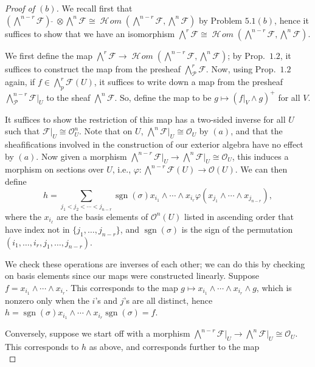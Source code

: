 \documentclass[12pt,letterpaper]{article}
\theoremstyle{definition}
\theoremstyle{remark}
\numberwithin{equation}{section}
\numberwithin{figure}{problem}
\DeclareMathOperator{\sgn}{sgn}
\newcommand{\FF}{\mathscr{F}}
\newcommand{\OO}{\mathcal{O}}
\newcommand{\PP}{\mathcal{P}}
\DeclareMathOperator{\HHom}{\mathscr{H}\!\mathit{om}}
\begin{document}
\begin{proof}[Proof of $(b)$]
  We recall first that $(\bigwedge^{n-r}\FF)\:\check{}\: \otimes \bigwedge^n\FF \cong \HHom(\bigwedge^{n-r}\FF,\bigwedge^n\FF)$ by Problem $5.1(b)$, hence it suffices to show that we have an isomorphism $\bigwedge^r\FF \cong \HHom(\bigwedge^{n-r}\FF,\bigwedge^n\FF)$.
  \par We first define the map $\bigwedge^r\FF \to \HHom(\bigwedge^{n-r}\FF,\bigwedge^n\FF)$; by Prop.~$1.2$, it suffices to construct the map from the presheaf $\bigwedge^r_\PP\FF$. Now, using Prop.~$1.2$ again, if $f \in \bigwedge^r_p\FF(U)$, it suffices to write down a map from the presheaf $\bigwedge^{n-r}_\PP\FF\vert_U$ to the sheaf $\bigwedge^n\FF$. So, define the map to be $g \mapsto (f\vert_V \wedge g)^+$ for all $V$.
  \par It suffices to show the restriction of this map has a two-sided inverse for all $U$ such that $\FF\vert_U \cong \OO_U^n$. Note that on $U$, $\bigwedge^n\FF\vert_U \cong \OO_U$ by $(a)$, and that the sheafifications involved in the construction of our exterior algebra have no effect by $(a)$. Now given a morphism $\bigwedge^{n-r}\FF\vert_U \to \bigwedge^n \FF\vert_U \cong \OO_U$, this induces a morphism on sections over $U$, i.e., $\varphi\colon\bigwedge^{n-r}\FF(U) \to \OO(U)$. We can then define
  \begin{equation*}
    h = \sum_{j_1 < j_2 < \cdots < j_{n-r}}\sgn(\sigma)x_{i_1}\wedge\cdots\wedge x_{i_r}\varphi(x_{j_1} \wedge \cdots \wedge x_{j_{n-r}}),
  \end{equation*}
  where the $x_{i_\ell}$ are the basis elements of $\OO^n(U)$ listed in ascending order that have index not in $\{j_1,\ldots,j_{n-r}\}$, and $\sgn(\sigma)$ is the sign of the permutation $(i_1,\ldots,i_r,j_1,\ldots,j_{n-r})$.
  \par We check these operations are inverses of each other; we can do this by checking on basis elements since our maps were constructed linearly. Suppose $f = x_{i_1} \wedge \cdots \wedge x_{i_r}$. This corresponds to the map $g \mapsto x_{i_1} \wedge \cdots \wedge x_{i_r} \wedge g$, which is nonzero only when the $i$'s and $j$'s are all distinct, hence $h = \sgn(\sigma)x_{i_1} \wedge \cdots \wedge x_{i_r}\sgn(\sigma) = f$.
  \par Conversely, suppose we start off with a morphism $\bigwedge^{n-r}\FF\vert_U \to \bigwedge^n \FF\vert_U \cong \OO_U$. This corresponds to $h$ as above, and corresponds further to the map
  \begin{equation*}

\end{equation*}
\end{proof}
\end{document}
